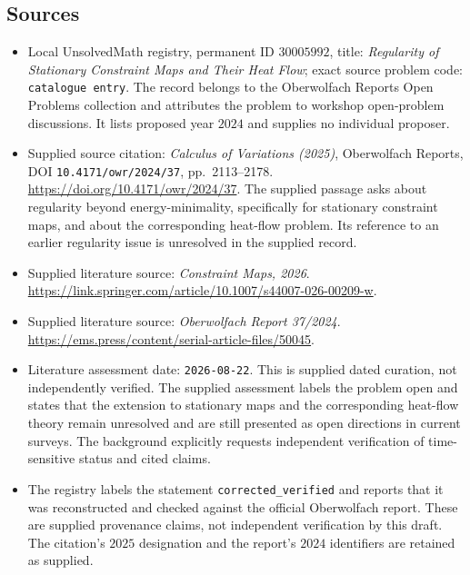 \documentclass[11pt]{article}
\begin{document}
\subsection{Sources}
\begin{itemize}
\item Local UnsolvedMath registry, permanent ID \(30005992\), title: \emph{Regularity of Stationary Constraint Maps and Their Heat Flow}; exact source problem code: \texttt{catalogue entry}. The record belongs to the Oberwolfach Reports Open Problems collection and attributes the problem to workshop open-problem discussions. It lists proposed year \(2024\) and supplies no individual proposer.
\item Supplied source citation: \emph{Calculus of Variations (2025)}, Oberwolfach Reports, DOI \texttt{10.4171/owr/2024/37}, pp.\ 2113--2178. \url{https://doi.org/10.4171/owr/2024/37}. The supplied passage asks about regularity beyond energy-minimality, specifically for stationary constraint maps, and about the corresponding heat-flow problem. Its reference to an earlier regularity issue is unresolved in the supplied record.
\item Supplied literature source: \emph{Constraint Maps, 2026}. \url{https://link.springer.com/article/10.1007/s44007-026-00209-w}.
\item Supplied literature source: \emph{Oberwolfach Report 37/2024}. \url{https://ems.press/content/serial-article-files/50045}.
\item Literature assessment date: \texttt{2026-08-22}. This is supplied dated curation, not independently verified. The supplied assessment labels the problem open and states that the extension to stationary maps and the corresponding heat-flow theory remain unresolved and are still presented as open directions in current surveys. The background explicitly requests independent verification of time-sensitive status and cited claims.
\item The registry labels the statement \texttt{corrected\_verified} and reports that it was reconstructed and checked against the official Oberwolfach report. These are supplied provenance claims, not independent verification by this draft. The citation's \(2025\) designation and the report's \(2024\) identifiers are retained as supplied.
\end{itemize}
\end{document}
